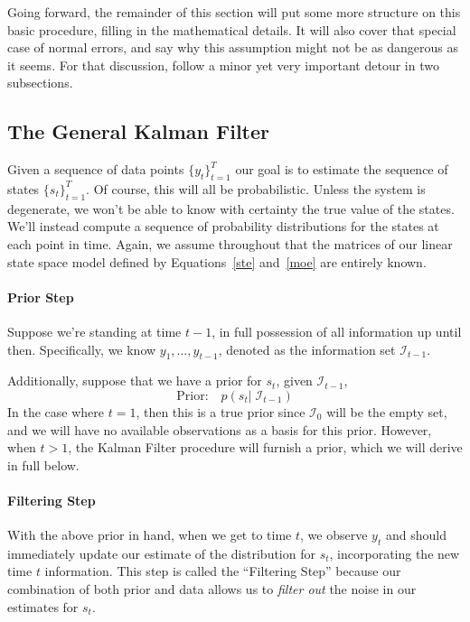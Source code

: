 \documentclass[a4paper,12pt]{article}
\begin{document}
Going forward, the remainder of this section will put some more
structure on this basic procedure, filling in the mathematical details.
It will also cover that special case of normal errors, and say why this
assumption might not be as dangerous as it seems. For that discussion,
follow a minor yet very important detour in two subsections.


\subsection{The General Kalman Filter}
\label{subsec:kfdetails}

Given a sequence of data points $\{y_t\}_{t=1}^T$ our goal is to
estimate the sequence of states $\{s_t\}^T_{t=1}$. Of course, this will
all be probabilistic. Unless the system is degenerate, we won't be able
to know with certainty the true value of the states. We'll instead
compute a sequence of probability distributions for the states at each
point in time. Again, we assume throughout that the matrices of our
linear state space model defined by Equations~\ref{ste} and~\ref{moe}
are entirely known.


\paragraph{Prior Step} Suppose we're standing at time $t-1$, in full possession of all information up until then. Specifically, we know $y_1, \ldots, y_{t-1}$, denoted as the information set $\mathcal{I}_{t-1}$. 

Additionally, suppose that we have a prior for $s_t$, given $\mathcal{I}_{t-1}$,
\begin{equation}
  \text{Prior:} \quad p(s_t | \; \mathcal{I}_{t-1}) 
  \label{pri}
\end{equation}
In the case where $t=1$, then this is a true prior since $\mathcal{I}_{0}$ will be the empty set, and we will have no available observations as a basis for this prior. However, when $t>1$, the Kalman Filter procedure will furnish a prior, which we will derive in full below.

\paragraph{Filtering Step}
With the above prior in hand, when we get to time $t$, we observe $y_t$ and should immediately update our estimate of the distribution for $s_t$, incorporating the new time $t$ information. This step is called the ``Filtering Step'' because our combination of both prior and data allows us to \emph{filter out} the noise in our estimates for $s_t$. 
\end{document}
